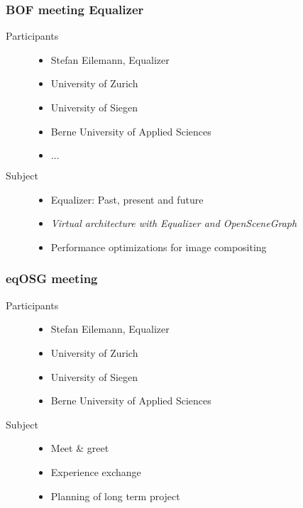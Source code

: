 \begin{frame}\frametitle{BOF meeting Equalizer}
	\begin{description}
		\item[Participants]
		\begin{itemize}
			\item Stefan Eilemann, Equalizer
			\item University of Zurich
			\item University of Siegen
			\item Berne University of Applied Sciences
			\item $\dots$
		\end{itemize}
		\item[Subject]
		\begin{itemize}
			\item Equalizer: Past, present and future
			\item \emph{Virtual architecture with Equalizer and OpenSceneGraph}
			\item Performance optimizations for image compositing
		\end{itemize}
	\end{description}
\end{frame}

\begin{frame}\frametitle{eqOSG meeting}
	\begin{description}
		\item[Participants]
		\begin{itemize}
			\item Stefan Eilemann, Equalizer
			\item University of Zurich
			\item University of Siegen
			\item Berne University of Applied Sciences
		\end{itemize}
		\item[Subject]
		\begin{itemize}
			\item Meet \& greet
			\item Experience exchange
			\item Planning of long term project
		\end{itemize}
	\end{description}
\end{frame}

